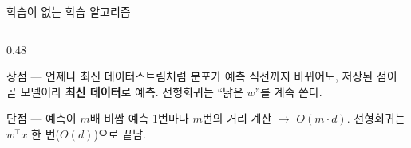 \begin{frame}{학습이 없는 학습 알고리즘}
  \begin{columns}[T]
    \begin{column}{0.48\textwidth}
      \begin{block}{장점 --- 언제나 최신}
        데이터스트림처럼 분포가 예측 직전까지 바뀌어도,
        저장된 점이 곧 모델이라 \textbf{최신 데이터}로 예측.
        선형회귀는 ``낡은 $w$''를 계속 쓴다.
      \end{block}
      \begin{alertblock}{단점 --- 예측이 $m$배 비쌈}
        예측 1번마다 $m$번의 거리 계산 $\to$ $O(m \cdot d)$.
        선형회귀는 $w^\top x$ 한 번($O(d)$)으로 끝남.
      \end{alertblock}
    \end{column}
  \end{columns}
\end{frame}
